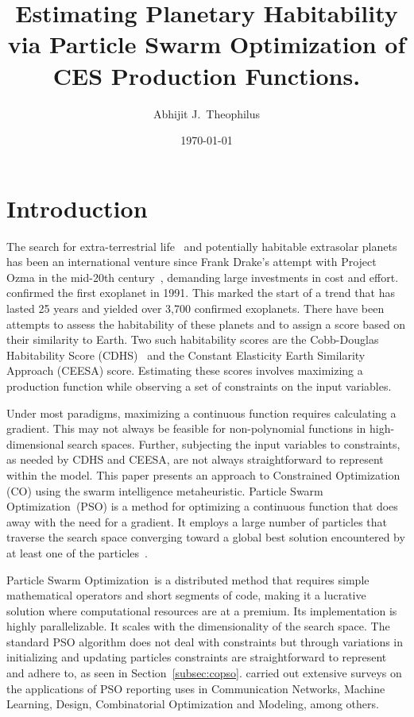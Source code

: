 \documentclass[10pt]{article}
\title{Estimating Planetary Habitability via Particle Swarm Optimization of CES Production Functions.}
\author{Abhijit J.\ Theophilus}
\date{\today}
\newcommand{\pso}{Particle Swarm Optimization}
\begin{document}
\maketitle


\section{Introduction}\label{sec:intro}

The search for extra-terrestrial life~\cite{Seth1,Biosig} and potentially habitable extrasolar
planets~\cite{Kepler,Presto} has been an international venture since Frank Drake's attempt with Project Ozma in the
mid-20th century~\cite{Ozma}, demanding large investments in cost and effort. \textcite{Exo1} confirmed the first
exoplanet in 1991. This marked the start of a trend that has lasted 25 years and yielded over 3,700 confirmed
exoplanets. There have been attempts to assess the habitability of these planets and to assign a score based on their
similarity to Earth. Two such habitability scores are the Cobb-Douglas Habitability Score (CDHS)~\cite{Bora,Saha} and
the Constant Elasticity Earth Similarity Approach (CEESA) score. Estimating these scores involves maximizing a
production function while observing a set of constraints on the input variables.

Under most paradigms, maximizing a continuous function requires calculating a gradient. This may not always be feasible
for non-polynomial functions in high-dimensional search spaces. Further, subjecting the input variables to constraints,
as needed by CDHS and CEESA, are not always straightforward to represent within the model. This paper presents an
approach to Constrained Optimization (CO) using the swarm intelligence metaheuristic. \pso\ (PSO) is a method for
optimizing a continuous function that does away with the need for a gradient. It employs a large number of particles
that traverse the search space converging toward a global best solution encountered by at least one of the
particles~\cite{PSO1,PSO2}.

\pso\ is a distributed method that requires simple mathematical operators and short segments of code, making it a
lucrative solution where computational resources are at a premium. Its implementation is highly parallelizable. It
scales with the dimensionality of the search space. The standard PSO algorithm does not deal with constraints but
through variations in initializing and updating particles constraints are straightforward to represent and adhere to, as
seen in Section~\ref{subsec:copso}. \textcite{Poli1,Poli2} carried out extensive surveys on the applications of PSO
reporting uses in Communication Networks, Machine Learning, Design, Combinatorial Optimization and Modeling, among
others.
\end{document}
